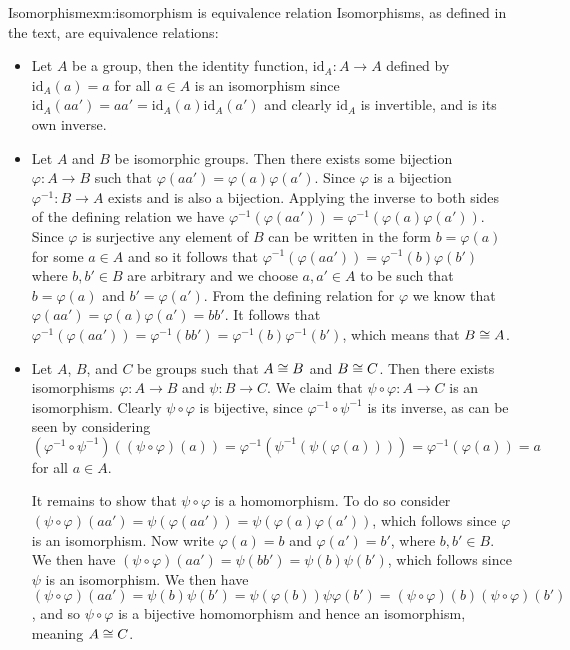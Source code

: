 \begin{exm}{Isomorphism}{exm:isomorphism is equivalence relation}
    Isomorphisms, as defined in the text, are equivalence relations:
    \begin{itemize}
        \item Let \(A\) be a group, then the identity function, \(\mathrm{id}_A\colon A \to A\) defined by \(\mathrm{id}_A(a) = a\) for all \(a \in A\) is an isomorphism since \(\mathrm{id}_A(aa') = aa' = \mathrm{id}_A(a)\mathrm{id}_A(a')\) and clearly \(\mathrm{id}_A\) is invertible, and is its own inverse.
        \item Let \(A\) and \(B\) be isomorphic groups.
        Then there exists some bijection \(\varphi \colon A \to B\) such that \(\varphi(aa') = \varphi(a)\varphi(a')\).
        Since \(\varphi\) is a bijection \(\varphi^{-1}\colon B \to A\) exists and is also a bijection.
        Applying the inverse to both sides of the defining relation we have \(\varphi^{-1}(\varphi(aa')) = \varphi^{-1}(\varphi(a)\varphi(a'))\).
        Since \(\varphi\) is surjective any element of \(B\) can be written in the form \(b = \varphi(a)\) for some \(a \in A\) and so it follows that \(\varphi^{-1}(\varphi(aa')) = \varphi^{-1}(b)\varphi(b')\) where \(b, b' \in B\) are arbitrary and we choose \(a, a' \in A\) to be such that \(b = \varphi(a)\) and \(b' = \varphi(a')\).
        From the defining relation for \(\varphi\) we know that \(\varphi(aa') = \varphi(a)\varphi(a') = bb'\).
        It follows that \(\varphi^{-1}(\varphi(aa')) = \varphi^{-1}(bb') = \varphi^{-1}(b)\varphi^{-1}(b')\), which means that \(B \cong A\).
        \item Let \(A\), \(B\), and \(C\) be groups such that \(A \cong B\) and \(B \cong C\).
        Then there exists isomorphisms \(\varphi \colon A \to B\) and \(\psi\colon B \to C\).
        We claim that \(\psi\circ \varphi \colon A \to C\) is an isomorphism.
        Clearly \(\psi\circ \varphi\) is bijective, since \(\varphi^{-1}\circ \psi^{-1}\) is its inverse, as can be seen by considering \((\varphi^{-1}\circ \psi^{-1})((\psi\circ \varphi)(a)) = \varphi^{-1}(\psi^{-1}(\psi(\varphi(a)))) = \varphi^{-1}(\varphi(a)) = a\) for all \(a \in A\).
        
        It remains to show that \(\psi \circ \varphi\) is a homomorphism.
        To do so consider \((\psi \circ \varphi)(aa') = \psi(\varphi(aa')) = \psi(\varphi(a)\varphi(a'))\), which follows since \(\varphi\) is an isomorphism.
        Now write \(\varphi(a) = b\) and \(\varphi(a') = b'\), where \(b, b' \in B\).
        We then have \((\psi \circ \varphi)(aa') = \psi(bb') = \psi(b)\psi(b')\), which follows since \(\psi\) is an isomorphism.
        We then have \((\psi \circ \varphi)(aa') = \psi(b)\psi(b') = \psi(\varphi(b))\psi\varphi(b') = (\psi \circ \varphi)(b)(\psi \circ \varphi)(b')\), and so \(\psi\circ\varphi\) is a bijective homomorphism and hence an isomorphism, meaning \(A \cong C\).
    \end{itemize}
\end{exm}

